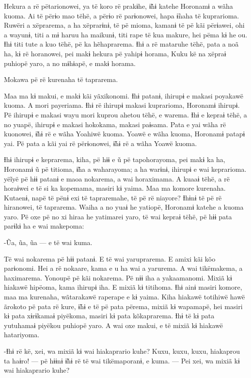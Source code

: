  

Hekura a rë pëtarionowei, ya të koro rë prakɨhe, ɨ̃hɨ katehe Horonamɨ a
wãha kuoma. Ai të përɨo mao tëhë, a përɨo rë parɨonowei, hapa ɨ̃naha të
kuprarioma. Ruwëri a xëprarema, a ha xëprarɨnɨ, të pë mioma, kamanɨ të
pë kãi përɨawei, ohi a wayunɨ, titi a mɨ haruu ha maikunɨ, titi rape të
kua makure, hei pëma kɨ he ou. Ɨhɨ titi tute a kuo tëhë, pë ka
hẽhaprarema. Ɨhɨ a rë mataruhe tëhë, pata a noã ha, kɨ rë horanowei, pei
makɨ hekura pë yahipɨ horama, Kuku kë na xëpraɨ puhiopë yaro, a no
mɨhɨapë, e makɨ horama. 

Mokawa pë rë kurenaha të taprarema. 

Maa ma kɨ makui, e makɨ kãi yãxikonomi. Ɨhɨ patanɨ, ihirupɨ e makasi
poyakawë kuoma. A mori payeriama. Ɨhɨ rë ihirupɨ makasi kuprarioma,
Horonamɨ ihirupɨ. Pë ihirupɨ e makasi wayu mori kuprou ahetou tëhë, e
warema. Ɨhɨ e kepraɨ tëhë, a no yuapë, ihirupɨ e makasi hokokama, makasi
paɨsama. Pata e yai wãha rë kuonowei, ɨ̃hɨ rë e wãha Yoahiwë kuoma. Yoawë
e wãha kuoma, Horonamɨ patapɨ yai. Pë pata a kãi yai rë përɨonowei, ɨ̃hɨ
rë a wãha Yoawë kuoma. 

Ɨhɨ ihirupɨ e keprarema, kiha, pë hɨɨ e ũ pë tapohorayoma, pei makɨ ka
ha, Horonamɨ ũ pë titioma, ɨ̃ha a waharayoma; a ha warɨnɨ, ihirupɨ e wai
keprarioma. yëĩyë pë hɨɨ patanɨ e maoa nokarema, a wai horaximama. A kuaaɨ tëhë, a rë horaɨwei e të si ka kopemama, masiri kɨ yaima. Maa ma
komore kurenaha. Kutaenɨ, napë të pënɨ exi të tapraremahe, të pë rë
niayore? Ɨhɨnɨ të pë rë hiranowei, të taprarema. Waiha a no yuaɨ he
yatiopë, Horonamɨ katehe a kuoma yaro. Pë oxe pë no xi hiraa he
yatimarei yaro, të wai kepraɨ tëhë, pë hɨɨ pata parɨkɨ ha e wai
makepoma:

-Ũa, ũa, ũa --- e të wai kuma. 

Të wai nokarema pë hɨɨ patanɨ. E të wai yaruprarema. E amixi kãi kõo
parɨonomi. Hei a rë nokaare, kama e u ha wai a yarurema. A wai
tikëmakema, a haximarema. Yonoupë pë kãi nokarema. Pë nɨɨ iha a
yakaamanomi. Mixiã kɨ hiakawë hipëoma, kama ihirupɨ iha. E mixiã kɨ
titihoma. Ɨhɨ ainɨ masiri komore, maa ma kurenaha, wãtarakawë raperape e
kɨ yaima. Kiha hiakawë totihiwë hawë ãrokoto pë pata rë kure, ɨ̃hɨ e të
pë pata përema, mixiã kɨ wapamapë, hei masiri kɨ pata xɨrɨkamaɨ
piyëkoma, masiri kɨ pata kõkaprarema. Ɨhɨ të kɨ pata yutuhamaɨ piyëkou
puhiopë yaro. A wai oxe makui, e të mixiã kɨ hiakawë hatariyoma. 

-Ɨhɨ rë kë, xei, wa mixiã kɨ wai hiakaprario kuhe? Kuxu, kuxu, kuxu,
hiakaprou ta haɨro! --- pë hɨɨnɨ ɨ̃hɨ rë të wai tikëmaporanɨ, e kuma. ---
Pei xei, wa mixiã kɨ wai hiakaprario kuhe?

